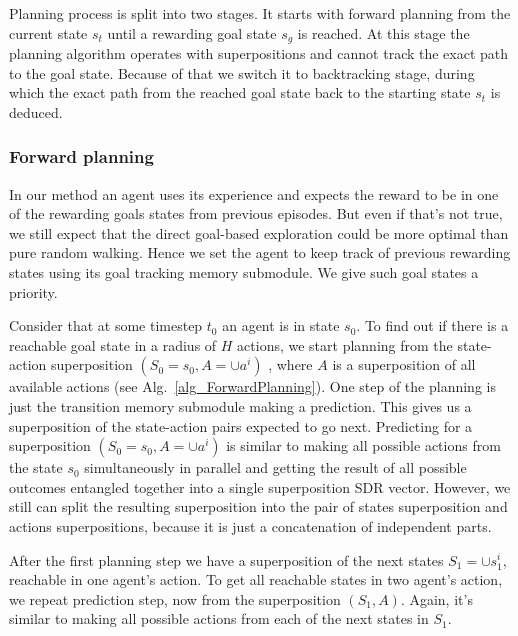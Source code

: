 \documentclass[a4paper,twoside]{article}
\begin{document}
Planning process is split into two stages. It starts with forward planning from the current state $s_t$ until a rewarding goal state $s_g$ is reached. At this stage the planning algorithm operates with superpositions and cannot track the exact path to the goal state. Because of that we switch it to backtracking stage, during which the exact path from the reached goal state back to the starting state $s_t$ is deduced.

\subsubsection{Forward planning}

In our method an agent uses its experience and expects the reward to be in one of the rewarding goals states from previous episodes. But even if that's not true, we still expect that the direct goal-based exploration could be more optimal than pure random walking. Hence we set the agent to keep track of previous rewarding states using its goal tracking memory submodule. We give such goal states a priority.

Consider that at some timestep $t_0$ an agent is in state $s_0$. To find out if there is a reachable goal state in a radius of $H$ actions, we start planning from the state-action superposition $(S_0 = s_0, A = \cup a^i)$ \footnotemark, where $A$ is a superposition of all available actions (see Alg.~\ref{alg_ForwardPlanning}). One step of the planning is just the transition memory submodule making a prediction. This gives us a superposition of the state-action pairs expected to go next. Predicting for a superposition $(S_0 = s_0, A = \cup a^i)$ is similar to making all possible actions from the state $s_0$ simultaneously in parallel and getting the result of all possible outcomes entangled together into a single superposition SDR vector. However, we still can split the resulting superposition into the pair of states superposition and actions superpositions, because it is just a concatenation of independent parts.


After the first planning step we have a superposition of the next states $S_1 = \cup s_1^i$, reachable in one agent's action. To get all reachable states in two agent's action, we repeat prediction step, now from the superposition $(S_1, A)$. Again, it's similar to making all possible actions from each of the next states in $S_1$.
\end{document}
